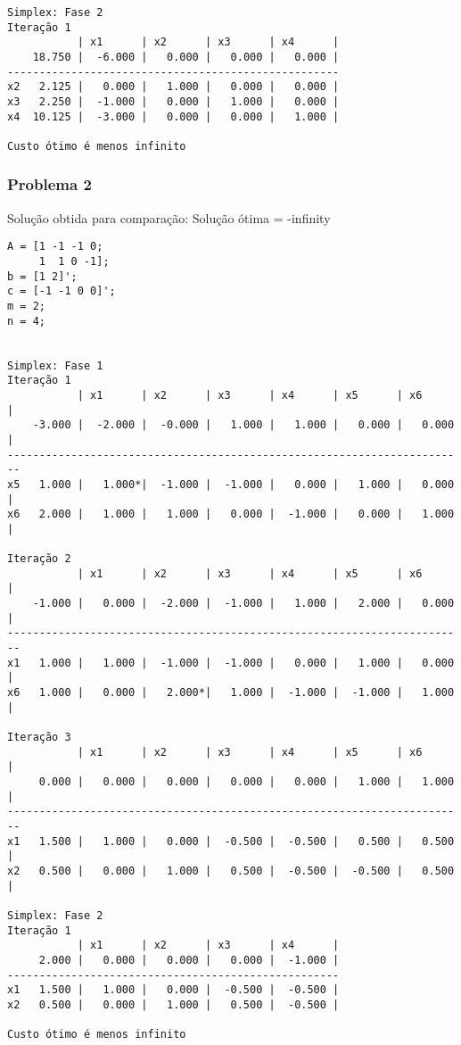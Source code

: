 \documentclass[brazil,times]{abnt}
\begin{document}
{\begin{verbatim}
Simplex: Fase 2
Iteração 1
           | x1      | x2      | x3      | x4      |
    18.750 |  -6.000 |   0.000 |   0.000 |   0.000 |
----------------------------------------------------
x2   2.125 |   0.000 |   1.000 |   0.000 |   0.000 |
x3   2.250 |  -1.000 |   0.000 |   1.000 |   0.000 |
x4  10.125 |  -3.000 |   0.000 |   0.000 |   1.000 |

Custo ótimo é menos infinito
\end{verbatim} }

\subsubsection*{Problema 2}
Solução obtida para comparação: Solução ótima = -infinity

{\scriptsize \begin{verbatim}
A = [1 -1 -1 0;
	 1  1 0 -1];
b = [1 2]';
c = [-1 -1 0 0]';
m = 2;
n = 4;


Simplex: Fase 1
Iteração 1
           | x1      | x2      | x3      | x4      | x5      | x6      |
    -3.000 |  -2.000 |  -0.000 |   1.000 |   1.000 |   0.000 |   0.000 |
------------------------------------------------------------------------
x5   1.000 |   1.000*|  -1.000 |  -1.000 |   0.000 |   1.000 |   0.000 |
x6   2.000 |   1.000 |   1.000 |   0.000 |  -1.000 |   0.000 |   1.000 |

Iteração 2
           | x1      | x2      | x3      | x4      | x5      | x6      |
    -1.000 |   0.000 |  -2.000 |  -1.000 |   1.000 |   2.000 |   0.000 |
------------------------------------------------------------------------
x1   1.000 |   1.000 |  -1.000 |  -1.000 |   0.000 |   1.000 |   0.000 |
x6   1.000 |   0.000 |   2.000*|   1.000 |  -1.000 |  -1.000 |   1.000 |

Iteração 3
           | x1      | x2      | x3      | x4      | x5      | x6      |
     0.000 |   0.000 |   0.000 |   0.000 |   0.000 |   1.000 |   1.000 |
------------------------------------------------------------------------
x1   1.500 |   1.000 |   0.000 |  -0.500 |  -0.500 |   0.500 |   0.500 |
x2   0.500 |   0.000 |   1.000 |   0.500 |  -0.500 |  -0.500 |   0.500 |

Simplex: Fase 2
Iteração 1
           | x1      | x2      | x3      | x4      |
     2.000 |   0.000 |   0.000 |   0.000 |  -1.000 |
----------------------------------------------------
x1   1.500 |   1.000 |   0.000 |  -0.500 |  -0.500 |
x2   0.500 |   0.000 |   1.000 |   0.500 |  -0.500 |

Custo ótimo é menos infinito
\end{verbatim} }
\end{document}
